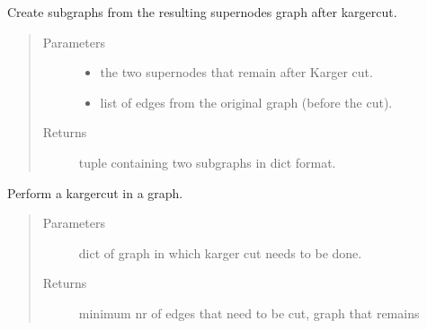\documentclass[letterpaper,10pt,english]{sphinxmanual}
\begin{document}
\begin{fulllineitems}
\label{\detokenize{clustering:clustering.karger2subgraph}}
\sphinxAtStartPar
Create subgraphs from the resulting supernodes graph after kargercut.
\begin{quote}\begin{description}
\item[{Parameters}] \leavevmode\begin{itemize}
\item {} 
\sphinxAtStartPar
{} \textendash{} the two supernodes that remain after Karger cut.

\item {} 
\sphinxAtStartPar
{} \textendash{} list of edges from the original graph (before the cut).

\end{itemize}

\item[{Returns}] \leavevmode
\sphinxAtStartPar
tuple containing two subgraphs in dict format.

\end{description}\end{quote}

\end{fulllineitems}


\begin{fulllineitems}
\label{\detokenize{clustering:clustering.kargerMinCut}}
\sphinxAtStartPar
Perform a kargercut in a graph.
\begin{quote}\begin{description}
\item[{Parameters}] \leavevmode
\sphinxAtStartPar
{} \textendash{} dict of graph in which karger cut needs to be done.

\item[{Returns}] \leavevmode
\sphinxAtStartPar
minimum nr of edges that need to be cut, graph that remains

\end{description}\end{quote}

\end{fulllineitems}
\end{document}
